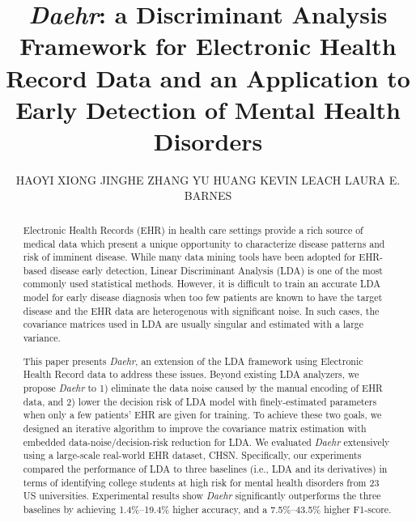 \documentclass[prodmode,acmtist]{acmsmall}
\newcommand{\TheName}{\mbox{\emph{Daehr}}}
\begin{document}
\title{\TheName{}: a Discriminant Analysis Framework for Electronic Health Record Data and an Application to Early Detection of Mental Health Disorders}

\author{
HAOYI XIONG
JINGHE ZHANG
YU HUANG
KEVIN LEACH
LAURA E. BARNES
}

\begin{abstract}
Electronic Health Records (EHR) in health care settings provide a rich source of medical data which present a unique opportunity to characterize disease patterns and risk of imminent disease. 
%
%
While many data mining tools have been adopted for EHR-based disease early detection, Linear Discriminant Analysis (LDA) is one of the most commonly used statistical methods.
However, it is difficult to train an accurate LDA model for early disease diagnosis when too few patients are known to have the target disease and the EHR data are heterogenous with  significant noise.  In such cases, the covariance matrices used in LDA are usually singular and estimated with a large variance.
 
This paper presents \TheName{}, an extension of the LDA framework using Electronic Health Record data to address these issues.
Beyond existing LDA analyzers, we propose \TheName{} to 1) eliminate the data noise caused by the manual encoding of EHR data, and 2) lower the decision risk of LDA model with finely-estimated parameters when only a few patients' EHR are given for training.
To achieve these two goals, we designed an iterative algorithm to improve the covariance matrix estimation with embedded data-noise/decision-risk reduction for LDA.
We evaluated \TheName{} extensively using a large-scale real-world EHR dataset, CHSN.
Specifically, our experiments compared the performance of LDA to three baselines (i.e., LDA and its derivatives) in terms of identifying college students at high risk for mental health disorders from 23 US universities.
Experimental results show \TheName{} significantly outperforms the three baselines by achieving 1.4\%--19.4\% higher accuracy, and a 7.5\%--43.5\% higher F1-score.


\end{abstract}
\end{document}
